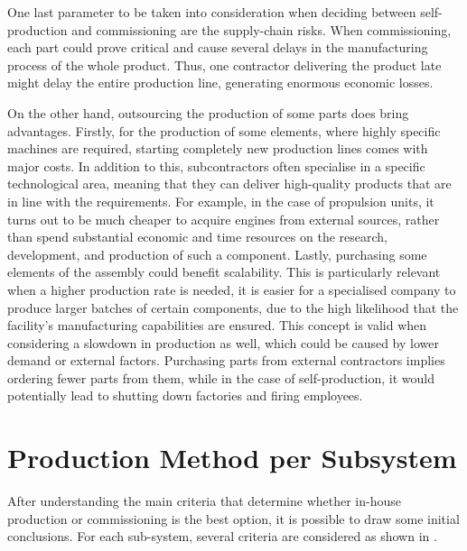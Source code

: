 One last parameter to be taken into consideration when deciding between self-production and commissioning are the supply-chain risks.
When commissioning, each part could prove critical and cause several delays in the manufacturing process of the whole product. Thus, one contractor delivering the product late might delay the entire production line, generating enormous economic losses.

On the other hand, outsourcing the production of some parts does bring advantages.
Firstly, for the production of some elements, where highly specific machines are required, starting completely new production lines comes with major costs.
In addition to this, subcontractors often specialise in a specific technological area, meaning that they can deliver high-quality products that are in line with the requirements.
For example, in the case of propulsion units, it turns out to be much cheaper to acquire engines from external sources, rather than spend substantial economic and time resources on the research, development, and production of such a component.
Lastly, purchasing some elements of the assembly could benefit scalability.
This is particularly relevant when a higher production rate is needed, it is easier for a specialised company to produce larger batches of certain components, due to the high likelihood that the facility's manufacturing capabilities are ensured.
This concept is valid when considering a slowdown in production as well, which could be caused by lower demand or external factors.
Purchasing parts from external contractors implies ordering fewer parts from them, while in the case of self-production, it would potentially lead to shutting down factories and firing employees.

\section{Production Method per Subsystem}
After understanding the main criteria that determine whether in-house production or commissioning is the best option, it is possible to draw some initial conclusions.
For each sub-system, several criteria are considered as shown in .

